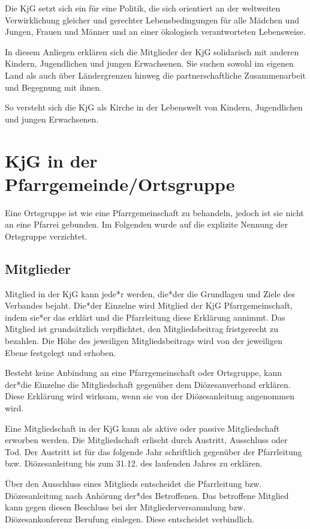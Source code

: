 \documentclass[12pt]{report}
\begin{document}
\begin{flushleft}
Die KjG setzt sich ein für eine Politik, die sich orientiert an der weltweiten Verwirklichung gleicher
und gerechter Lebensbedingungen für alle Mädchen und Jungen, Frauen und Männer und an einer
ökologisch verantworteten Lebensweise.

In diesem Anliegen erklären sich die Mitglieder der KjG solidarisch mit anderen Kindern, Jugendlichen und jungen Erwachsenen.
Sie suchen sowohl im eigenen Land als auch über Ländergrenzen
hinweg die partnerschaftliche Zusammenarbeit und Begegnung mit ihnen.

So versteht sich die KjG als Kirche in der Lebenswelt von Kindern, Jugendlichen und jungen Erwachsenen.

\chapter{KjG in der Pfarrgemeinde/Ortsgruppe}
Eine Ortsgruppe ist wie eine Pfarrgemeinschaft zu behandeln, jedoch ist sie nicht an eine Pfarrei
gebunden. Im Folgenden wurde auf die explizite Nennung der Ortsgruppe verzichtet.
\section{Mitglieder}
Mitglied in der KjG kann jede*r werden, die*der die Grundlagen und Ziele des Verbandes bejaht.
Die*der Einzelne wird Mitglied der KjG Pfarrgemeinschaft, indem sie*er das erklärt und die Pfarrleitung diese Erklärung annimmt.
Das Mitglied ist grundsätzlich verpflichtet, den Mitgliedsbeitrag fristgerecht zu bezahlen.
Die Höhe des jeweiligen Mitgliedsbeitrags wird von der jeweiligen
Ebene festgelegt und erhoben.

Besteht keine Anbindung an eine Pfarrgemeinschaft oder Ortsgruppe, kann der*die Einzelne
die Mitgliedschaft gegenüber dem Diözesanverband erklären. Diese Erklärung wird wirksam,
wenn sie von der Diözesanleitung angenommen wird.

Eine Mitgliedschaft in der KjG kann als aktive oder passive Mitgliedschaft erworben werden.
Die Mitgliedschaft erlischt durch Austritt, Ausschluss oder Tod. Der Austritt ist für das folgende Jahr
schriftlich gegenüber der Pfarrleitung bzw. Diözesanleitung bis zum 31.12. des laufenden Jahres zu erklären.

Über den Ausschluss eines Mitglieds entscheidet die Pfarrleitung bzw. Diözesanleitung nach Anhörung der*des Betroffenen.
Das betroffene Mitglied kann gegen diesen Beschluss bei der
Mitgliederversammlung bzw. Diözesankonferenz Berufung einlegen. Diese entscheidet verbindlich.

\end{flushleft}
\end{document}
